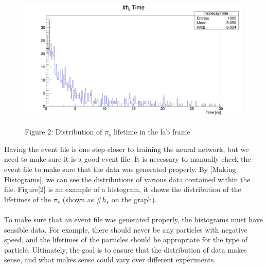 \documentclass[10pt,a4paper]{report}
\begin{document}
\begin{figure}
\includegraphics[scale=.16]{Figure2}
\begin{center}
{\scriptsize Figure 2: Distribution of $\pi_s$ lifetime in the lab frame}
\end{center}
\end{figure}

\noindent Having the event file is one step closer to training the neural network, but we need to make sure it is a good event file. It is necessary to manually check the event file to make sure that the data was generated properly. By [Making Histograms], we can see the distributions of various data contained within the file. Figure[2] is an example of a histogram, it shows the distribution of the lifetimes of the $\pi_s$ (shown as $\#h_s$ on the graph).\\\\
To make sure that an event file was generated properly, the histograms must have sensible data. For example, there should never be any particles with negative speed, and the lifetimes of the particles should be appropriate for the type of particle. Ultimately, the goal is to ensure that the distribution of data makes sense, and what makes sense could vary over different experiments.
\end{document}
